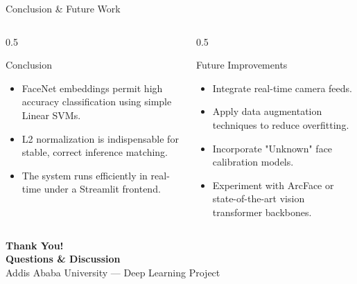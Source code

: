 \documentclass[aspectratio=169]{beamer}
\begin{document}
\begin{frame}{Conclusion \& Future Work}
  \begin{columns}
    \begin{column}{0.5\textwidth}
      \begin{block}{Conclusion}
        \begin{itemize}
          \item FaceNet embeddings permit high accuracy classification using simple Linear SVMs.
          \item L2 normalization is indispensable for stable, correct inference matching.
          \item The system runs efficiently in real-time under a Streamlit frontend.
        \end{itemize}
      \end{block}
    \end{column}
    \begin{column}{0.5\textwidth}
      \begin{block}{Future Improvements}
        \begin{itemize}
          \item Integrate real-time camera feeds.
          \item Apply data augmentation techniques to reduce overfitting.
          \item Incorporate "Unknown" face calibration models.
          \item Experiment with ArcFace or state-of-the-art vision transformer backbones.
        \end{itemize}
      \end{block}
    \end{column}
  \end{columns}
\end{frame}

{
\begin{frame}[plain]
  \centering
  \vspace{2cm}
  {\Huge \textcolor{deepblue}{\textbf{Thank You!}}}\\[1.5em]
  {\Large \textbf{Questions \& Discussion}}\\[0.8em]
  {\small Addis Ababa University --- Deep Learning Project}
\end{frame}
}
\end{document}
